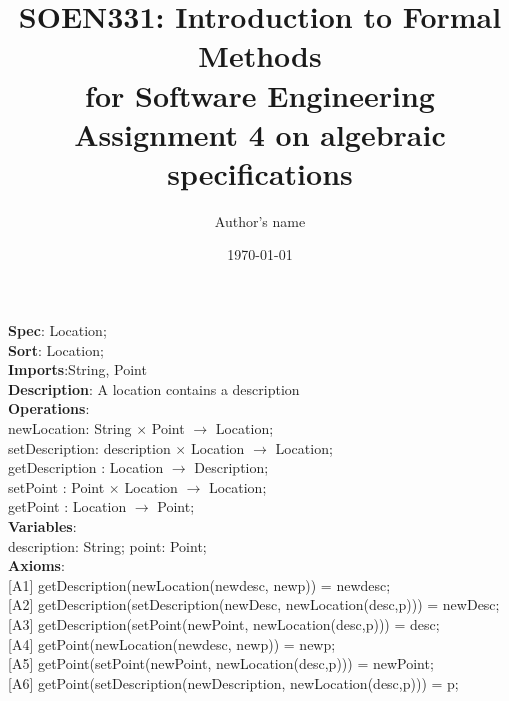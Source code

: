 \documentclass[12pt]{article}
\title{SOEN331: Introduction to Formal Methods\\for Software Engineering\\
Assignment 4 on algebraic specifications}
\author{Author's name}
\date{\today}
\begin{document}
\begin{spacing}{1.5}

\maketitle

\noindent \textbf{Spec}: Location;\\
\noindent \textbf{Sort}: Location;\\
\noindent \textbf{Imports}:String, Point\\
\noindent \textbf{Description}: A location contains a description \\
\noindent \textbf{Operations}:\\
\hspace*{5mm} newLocation: String $\times$ Point $\rightarrow$ Location;\\
\hspace*{5mm} setDescription: description $\times$ Location $\rightarrow$ Location;\\
\hspace*{5mm} getDescription : Location $\rightarrow$ Description;\\
\hspace*{5mm} setPoint : Point $\times$ Location $\rightarrow$ Location;\\
\hspace*{5mm} getPoint : Location $\rightarrow$ Point;\\
\noindent \textbf{Variables}:\\
\hspace*{5mm} description: String; point: Point;\\
\noindent \textbf{Axioms}:\\
\hspace*{5mm} [A1] getDescription(newLocation(newdesc, newp)) = newdesc;\\
\hspace*{5mm} [A2] getDescription(setDescription(newDesc, newLocation(desc,p))) = newDesc;\\
\hspace*{5mm} [A3] getDescription(setPoint(newPoint, newLocation(desc,p))) = desc;\\
\hspace*{5mm} [A4] getPoint(newLocation(newdesc, newp)) = newp;\\
\hspace*{5mm} [A5] getPoint(setPoint(newPoint, newLocation(desc,p))) = newPoint;\\
\hspace*{5mm} [A6] getPoint(setDescription(newDescription, newLocation(desc,p))) = p;\\

\end{spacing}
\end{document}
